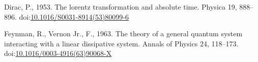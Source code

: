 \documentclass[]{elsarticle} %
\begin{document}
\hypertarget{refs}{}
\leavevmode\hypertarget{ref-Dirac1953888}{}%
Dirac, P., 1953. The lorentz transformation and absolute time. Physica
19, 888--896.
doi:\href{https://doi.org/10.1016/S0031-8914(53)80099-6}{10.1016/S0031-8914(53)80099-6}

\leavevmode\hypertarget{ref-Feynman1963118}{}%
Feynman, R., Vernon Jr., F., 1963. The theory of a general quantum
system interacting with a linear dissipative system. Annals of Physics
24, 118--173.
doi:\href{https://doi.org/10.1016/0003-4916(63)90068-X}{10.1016/0003-4916(63)90068-X}
\end{document}
